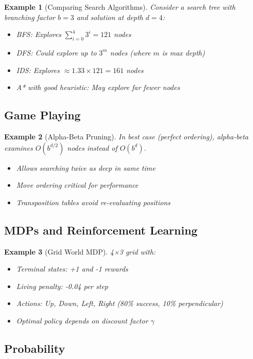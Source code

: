 \documentclass[11pt,letterpaper]{article}
\newtheorem{example}{Example}[section]
\begin{document}
\begin{example}[Comparing Search Algorithms]
Consider a search tree with branching factor $b=3$ and solution at depth $d=4$:
\begin{itemize}
    \item BFS: Explores $\sum_{i=0}^4 3^i = 121$ nodes
    \item DFS: Could explore up to $3^m$ nodes (where $m$ is max depth)
    \item IDS: Explores $\approx 1.33 \times 121 = 161$ nodes
    \item A* with good heuristic: May explore far fewer nodes
\end{itemize}
\end{example}

\subsection{Game Playing}

\begin{example}[Alpha-Beta Pruning]
In best case (perfect ordering), alpha-beta examines $O(b^{d/2})$ nodes instead of $O(b^d)$.
\begin{itemize}
    \item Allows searching twice as deep in same time
    \item Move ordering critical for performance
    \item Transposition tables avoid re-evaluating positions
\end{itemize}
\end{example}

\subsection{MDPs and Reinforcement Learning}

\begin{example}[Grid World MDP]
4×3 grid with:
\begin{itemize}
    \item Terminal states: +1 and -1 rewards
    \item Living penalty: -0.04 per step
    \item Actions: Up, Down, Left, Right (80\% success, 10\% perpendicular)
    \item Optimal policy depends on discount factor $\gamma$
\end{itemize}
\end{example}

\subsection{Probability}
\end{document}
